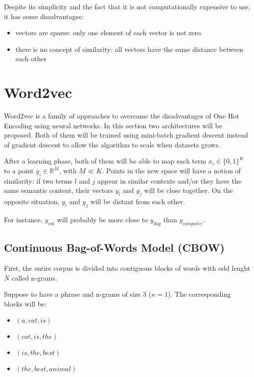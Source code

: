 Despite its simplicity and the fact that it is not computationally expensive to use, it has some disadvantages:
\begin{itemize}
    \item vectors are sparse: only one element of each vector is not zero
    \item there is no concept of similarity: all vectors have the same distance between each other
\end{itemize}

\section{Word2vec}

Word2vec is a family of approaches to overcome the disadvantages of One Hot Encoding using neural networks.
In this section two architectures will be proposed.
Both of them will be trained using mini-batch gradient descent instead of gradient descent to allow the algorithm to scale when datasets grows.

After a learning phase, both of them will be able to map each term $x_i \in \{0, 1\}^K$ to a point $y_i \in \mathbb{R}^M$, with $M \ll K$.
Points in the new space will have a notion of similarity:
if two terms $l$ and $j$ appear in similar contexts and/or they have the same semantic content,
their vectors $y_l$ and $y_j$ will be close together.
On the opposite situation, $y_l$ and $y_j$ will be distant from each other.

For instance, $y_{cat}$ will probably be more close to $y_{dog}$ than $y_{computer}$.

\subsection{Continuous Bag-of-Words Model (CBOW)}
First, the entire corpus is divided into contiguous blocks of words with odd lenght $N$ called n-grams.

Suppose to have a phrase  and n-grams of size $3$ ($n=1$).
The corresponding blocks will be:
\begin{multicols}{2}
    \begin{itemize}
        \item $(a, cat, is)$
        \item $(cat, is, the)$
        \item $(is, the, best)$
        \item $(the, best, animal)$
    \end{itemize}
\end{multicols}

